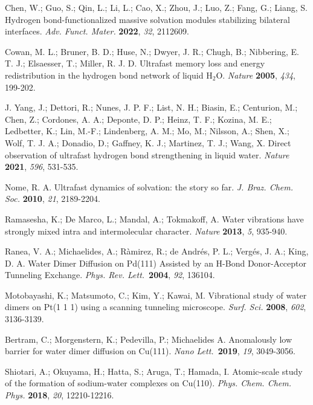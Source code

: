 \documentclass[aps,twocolumn,amssymb,amsfonts,amsmath,showpacs,final,a4paper,superscriptaddress]{revtex4-2}
\begin{document}
\begin{thebibliography}{99}
 Chen, W.; Guo, S.; Qin, L.; Li, L.; Cao, X.; Zhou, J.; Luo, Z.; Fang, G.; Liang, S. Hydrogen bond-functionalized massive solvation modules stabilizing bilateral interfaces. \textit{Adv. Funct. Mater.} \textbf{2022}, \textit{32}, 2112609.

 Cowan, M. L.; Bruner, B. D.; Huse, N.; Dwyer, J. R.; Chugh, B.; Nibbering, E. T. J.; Elsaesser, T.; Miller, R. J. D. Ultrafast memory loss and energy redistribution in the hydrogen bond network of liquid H$_2$O. \textit{Nature} \textbf{2005}, \textit{434}, 199-202.

 J. Yang, J.; Dettori, R.; Nunes, J. P. F.; List, N. H.; Biasin, E.; Centurion, M.; Chen, Z.; Cordones, A. A.; Deponte, D. P.; Heinz, T. F.; Kozina, M. E.; Ledbetter, K.; Lin, M.-F.; Lindenberg, A. M.; Mo, M.; Nilsson, A.; Shen, X.; Wolf, T. J. A.; Donadio, D.; Gaffney, K. J.; Martinez, T. J.; Wang, X. Direct observation of ultrafast hydrogen bond strengthening in liquid water. \textit{Nature} \textbf{2021}, \textit{596}, 531-535.

 Nome, R. A. Ultrafast dynamics of solvation: the story so far. \textit{J. Braz. Chem. Soc.} \textbf{2010}, \textit{21}, 2189-2204.


 Ramasesha, K.; De Marco, L.; Mandal, A.; Tokmakoff, A. Water vibrations have strongly mixed intra and intermolecular character. \textit{Nature} \textbf{2013}, \textit{5}, 935-940.

 Ranea, V. A.; Michaelides, A.; R\`amirez, R.; de Andr\'es, P. L.; Verg\'es, J. A.; King, D. A. Water Dimer Diffusion on Pd(111) Assisted by an H-Bond Donor-Acceptor Tunneling Exchange. \textit{Phys. Rev. Lett.}\ \textbf{2004}, \textit{92}, 136104.

 Motobayashi, K.; Matsumoto, C.; Kim, Y.; Kawai, M. Vibrational study of water dimers on Pt(1 1 1) using a scanning tunneling microscope. \textit{Surf. Sci.} \textbf{2008}, \textit{602}, 3136-3139.

 Bertram, C.; Morgenstern, K.; Pedevilla, P.; Michaelides A. Anomalously low barrier for water dimer diffusion on Cu(111). \textit{Nano Lett.}\ \textbf{2019}, \textit{19}, 3049-3056.

 Shiotari, A.; Okuyama, H.; Hatta, S.; Aruga, T.; Hamada, I. Atomic-scale study of the formation of sodium-water complexes on Cu(110). \textit{Phys. Chem. Chem. Phys.} \textbf{2018}, \textit{20}, 12210-12216.


\end{thebibliography}
\end{document}
